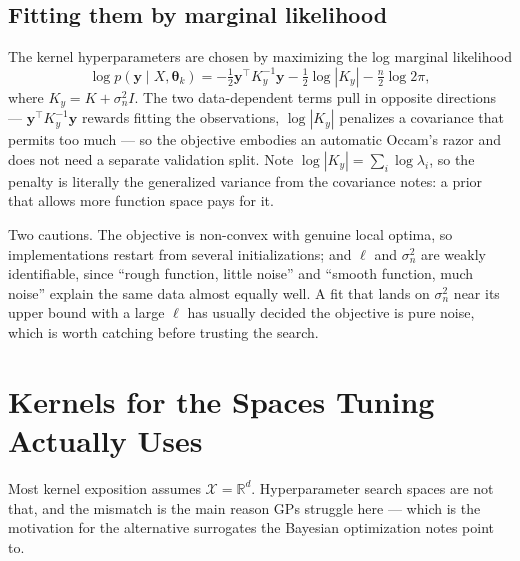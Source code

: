 \documentclass[conference]{IEEEtran}
\begin{document}
\subsection*{Fitting them by marginal likelihood}
The kernel hyperparameters are chosen by maximizing the log marginal likelihood
\begin{equation}
    \log p(\mathbf{y} \mid X, \boldsymbol{\theta}_k) =
    -\tfrac{1}{2}\mathbf{y}^{\!\top}K_y^{-1}\mathbf{y}
    -\tfrac{1}{2}\log|K_y|
    -\tfrac{n}{2}\log 2\pi,
\end{equation}
where $K_y = K + \sigma_n^2 I$. The two data-dependent terms pull in opposite directions --- $\mathbf{y}^{\!\top}K_y^{-1}\mathbf{y}$ rewards fitting the observations, $\log|K_y|$ penalizes a covariance that permits too much --- so the objective embodies an automatic Occam's razor and does not need a separate validation split. Note $\log|K_y| = \sum_i \log \lambda_i$, so the penalty is literally the generalized variance from the covariance notes: a prior that allows more function space pays for it.

Two cautions. The objective is non-convex with genuine local optima, so implementations restart from several initializations; and $\ell$ and $\sigma_n^2$ are weakly identifiable, since ``rough function, little noise'' and ``smooth function, much noise'' explain the same data almost equally well. A fit that lands on $\sigma_n^2$ near its upper bound with a large $\ell$ has usually decided the objective is pure noise, which is worth catching before trusting the search.

\section*{Kernels for the Spaces Tuning Actually Uses}
Most kernel exposition assumes $\mathcal{X} = \mathbb{R}^d$. Hyperparameter search spaces are not that, and the mismatch is the main reason GPs struggle here --- which is the motivation for the alternative surrogates the Bayesian optimization notes point to.
\end{document}
